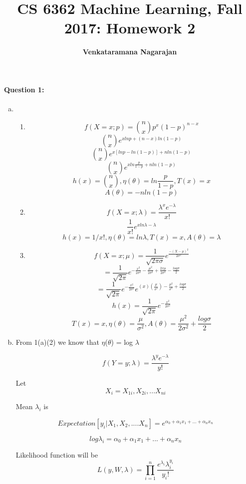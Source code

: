 \documentclass[letterpaper,11pt]{article}
\title{CS 6362 Machine Learning, Fall 2017: Homework 2}
\date{}
\author{\bf Venkataramana Nagarajan}
\begin{document}
\maketitle

\paragraph{Question 1:}
\begin{enumerate}[(a)]
\item \begin{enumerate}[(1)]
\item
\[
	f(X=x;p) = \binom{n}{x} p^x (1-p)^{n-x}
\]
\[
	\binom{n}{x}e^{xlnp + (n-x)ln(1-p)}
\]
\[
	\binom{n}{x}e^{x[lnp - ln(1-p)] + nln(1-p)}
\]
\[
	\binom{n}{x}e^{xln \frac {p}{1-p} + nln(1-p)}
\]
\[
	h(x)=\binom{n}{x}, \eta(\theta) = ln\frac {p}{1-p}, T(x) = x
\]
\[
	A(\theta) = -nln(1-p)
\]
\bigskip
\item
\[
	f(X=x;\lambda) = \frac{\lambda^x e^{-\lambda}}{x!}
\]
\[
	\frac{1}{x!} e^{xln\lambda - \lambda}
\]
\[
	h(x)=1/x!, \eta(\theta) = ln\lambda, T(x) = x, A(\theta) = \lambda
\]
\bigskip
\item
\[
	f(X=x;\mu) = \frac{1}{\sqrt{2\pi\sigma}} e ^{\frac{-(X-\mu)^2}{2\sigma^2}}
\]
\[
	= \frac{1}{\sqrt{2\pi}} e^{-\frac{x^2}{2\sigma^2} - \frac{\mu^2}{2\sigma^2} + \frac{2x\mu}{2\sigma^2} - \frac{log\sigma}{2}} 
\]
\[
	= \frac{1}{\sqrt{2\pi}} e^{-\frac{x^2}{2\sigma^2}} e^{(x)(\frac{\mu}{\sigma^2}) - \frac{\mu^2}{\sigma^2} + \frac{log\sigma}{2} }
\]
\[
	h(x) = \frac{1}{\sqrt{2\pi}} e^{-\frac{x^2}{2\sigma^2}}	
\]
\[
	T(x) = x, \eta(\theta) = \frac{\mu}{\sigma^2}, A(\theta) = \frac{\mu^2}{2\sigma^2} + \frac{log\sigma}{2}
\]
\end{enumerate}
\bigskip
\item

From 1(a)(2) we know that 
$\eta$($\theta$) = log $\lambda$ 

\[
	f(Y=y;\lambda) = \frac{\lambda^y e^{-\lambda}}{y!}
\]

Let
\[
	X_i = { X_{1i},X_{2i},... X_{ni} }
\]

Mean $\lambda_i$ is

\[
	Expectation[y_i|X_1,X_2,....X_n] = e^{\alpha_0 + \alpha_1x_1+...+ \alpha_nx_n} 
\]

\[
	log\lambda_i = \alpha_0 + \alpha_1x_1+...+ \alpha_nx_n
\]

Likelihood function will be 
\[
	L(y,W,\lambda) = \prod_{i=1}^n \frac{e^{\lambda_i} \lambda_i^{y_i}}{y_i!}
\]


\end{enumerate}
\end{document}
